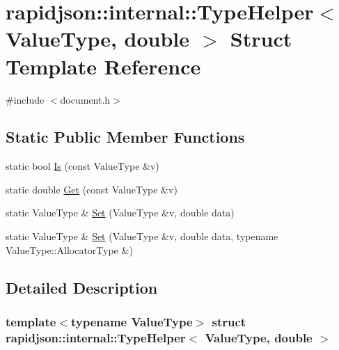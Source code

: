 \hypertarget{structrapidjson_1_1internal_1_1_type_helper_3_01_value_type_00_01double_01_4}{}\section{rapidjson\+::internal\+::Type\+Helper$<$ Value\+Type, double $>$ Struct Template Reference}
\label{structrapidjson_1_1internal_1_1_type_helper_3_01_value_type_00_01double_01_4}


{\ttfamily \#include $<$document.\+h$>$}

\subsection*{Static Public Member Functions}
\begin{DoxyCompactItemize}
\item 
static bool \mbox{\hyperlink{structrapidjson_1_1internal_1_1_type_helper_3_01_value_type_00_01double_01_4_a5cca8c3dc25f5ef047c2620dfe5bb6c9}{Is}} (const Value\+Type \&v)
\item 
static double \mbox{\hyperlink{structrapidjson_1_1internal_1_1_type_helper_3_01_value_type_00_01double_01_4_a7828e46bc09a44c4fb0b14886fa14ee0}{Get}} (const Value\+Type \&v)
\item 
static Value\+Type \& \mbox{\hyperlink{structrapidjson_1_1internal_1_1_type_helper_3_01_value_type_00_01double_01_4_ae1d0e8fd88d75c2340cf596ccb0fb073}{Set}} (Value\+Type \&v, double data)
\item 
static Value\+Type \& \mbox{\hyperlink{structrapidjson_1_1internal_1_1_type_helper_3_01_value_type_00_01double_01_4_a5ebb37c931bf678482df99826c2ef940}{Set}} (Value\+Type \&v, double data, typename Value\+Type\+::\+Allocator\+Type \&)
\end{DoxyCompactItemize}


\subsection{Detailed Description}
\subsubsection*{template$<$typename Value\+Type$>$\newline
struct rapidjson\+::internal\+::\+Type\+Helper$<$ Value\+Type, double $>$}



